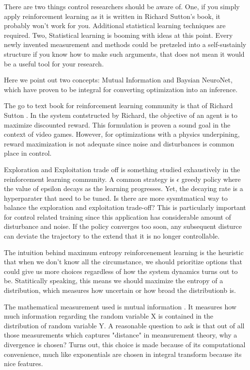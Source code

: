 \documentclass[journal]{IEEEtran}
\begin{document}
There are two things control researchers should be aware of. One, if you simply apply reinforcement learning as it is written in Richard Sutton's book, it probably won't work for you. Additional statistical learning techniques are required. Two, Statistical learning is booming with ideas at this point. Every newly invented measurement and methods could be pretzeled into a self-sustainly structure if you know how to make such arguments, that does not mean it would be a useful tool for your research.

Here we point out two concepts: Mutual Information and Baysian NeuroNet, which have proven to be integral for converting optimization into an inference.

The go to text book for reinforcement learning community is that of Richard Sutton \cite{Sutton1998IntroductionTR}. In the system contstructed by Richard, the objective of an agent is to maximize discounted reward. This formulation is proven a sound goal in the context of video games. However, for optimizations with a physics underpining, reward maximization is not adequate since noise and disturbances is common place in control.

Exploration and Exploitation trade off is something studied exhaustively in the reinforcement learning community. A common strategy is $\epsilon$ greedy policy where the value of epsilon decays as the learning progresses. Yet, the decaying rate is a hyperparater that need to be tuned. Is there are more sysmtmatical way to balance the exploration and exploitation trade-off? This is particularly important for control related training since this application has considerable amount of disturbance and noise. If the policy converges too soon, any subsequent disturce can deviate the trajectory to the extend that it is no longer controllable.

The intuition behind maximum entropy reinforcenement learning is the heuristic that when we don't know all the circumstance, we should prioritize options that could give us more choices regardless of how the system dynamics turns out to be. Statitically speaking, this means we should maximize the entropy of a distribution, which measures how uncertain or how broad the distributionb is.

The mathematical measurement used is mutual information \cite{Kullback1951ONIA}. It measures how much information regarding the random variable X is contained in the distribution of random variable Y. A reasonable question to ask is that out of all those measurements which captures "distance" in meansurement theory, why a divergence is chosen? Turns out, this choice is made because of its computational convenience, much like exponentials are chosen in integral transform because its nice features.
\end{document}
